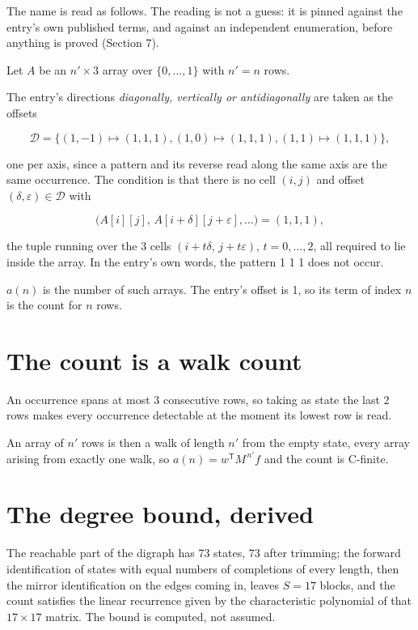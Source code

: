\documentclass[11pt]{article}
\theoremstyle{definition}
\begin{document}
The name is read as follows. The reading is not a guess: it is pinned against the entry's own published terms, and against an independent enumeration, before anything is proved (Section 7).

Let $A$ be an $n' \times 3$ array over $\{0,\dots,1\}$ with $n' = n$ rows.

The entry's directions {\itshape diagonally, vertically or antidiagonally} are taken as the offsets

\[\mathcal{D} = \{(1,-1)\mapsto(1,1,1), (1,0)\mapsto(1,1,1), (1,1)\mapsto(1,1,1)\},\]

one per axis, since a pattern and its reverse read along the same axis are the same occurrence. The condition is that there is no cell $(i,j)$ and offset $(\delta,\varepsilon)\in\mathcal{D}$ with

\[\bigl(A[i][j],\,A[i{+}\delta][j{+}\varepsilon],\dots\bigr) = (1, 1, 1),\]

the tuple running over the $3$ cells $(i+t\delta,\,j+t\varepsilon)$, $t = 0,\dots,2$, all required to lie inside the array. In the entry's own words, the pattern 1 1 1 does not occur.

$a(n)$ is the number of such arrays. The entry's offset is 1, so its term of index $n$ is the count for $n$ rows.

\section{The count is a walk count}

An occurrence spans at most $3$ consecutive rows, so taking as state the last $2$ rows makes every occurrence detectable at the moment its lowest row is read.

An array of $n'$ rows is then a walk of length $n'$ from the empty state, every array arising from exactly one walk, so $a(n) = w^{\mathsf T}M^{\,n'}f$ and the count is C-finite.

\section{The degree bound, derived}

The reachable part of the digraph has $73$ states, $73$ after trimming; the forward identification of states with equal numbers of completions of every length, then the mirror identification on the edges coming in, leaves $S = 17$ blocks, and the count satisfies the linear recurrence given by the characteristic polynomial of that $17\times17$ matrix. The bound is computed, not assumed.
\end{document}
